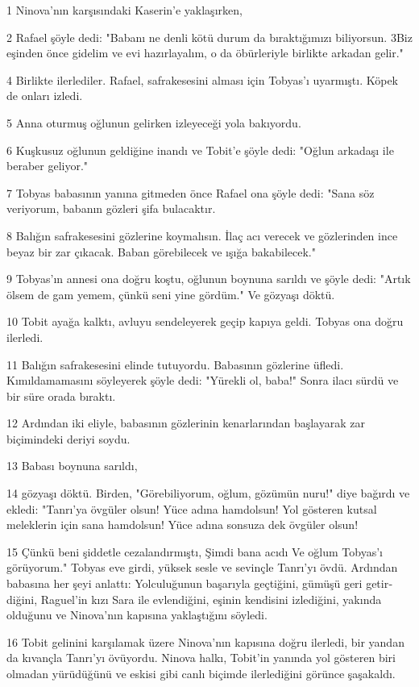 \par 1 Ninova'nın karşısındaki Kaserin'e yaklaşırken,
\par 2 Rafael şöy­le dedi: "Babanı ne denli kötü durum da bıraktığımızı biliyorsun. 3Biz eşin­den önce gidelim ve evi hazırlayalım, o da öbürleriyle birlikte arkadan ge­lir."
\par 4 Birlikte ilerlediler. Rafael, safrakesesini alması için Tobyas'ı uyar­mıştı. Köpek de onları izledi.
\par 5 Anna oturmuş oğlunun gelirken izleyeceği yola bakıyordu.
\par 6 Kuşkusuz oğlunun geldiğine inandı ve Tobit'e şöyle dedi: "Oğlun arkadaşı ile bera­ber geliyor."
\par 7 Tobyas babasının yanına gitme­den önce Rafael ona şöyle dedi: "Sa­na söz veriyorum, babanın gözleri şi­fa bulacaktır.
\par 8 Balığın safrakesesini gözlerine koymalısın. İlaç acı verecek ve gözlerinden ince beyaz bir zar çı­kacak. Baban görebilecek ve ışığa ba­kabilecek."
\par 9 Tobyas'ın annesi ona doğru koş­tu, oğlunun boynuna sarıldı ve şöyle dedi: "Artık ölsem de gam yemem, çünkü seni yine gördüm." Ve gözyaşı döktü.
\par 10 Tobit ayağa kalktı, avluyu sen­deleyerek geçip kapıya geldi. Tobyas ona doğru ilerledi.
\par 11 Balığın safrake­sesini elinde tutuyordu. Babasının göz­lerine üfledi. Kımıldamamasını söyle­yerek şöyle dedi: "Yürekli ol, baba!" Sonra ilacı sürdü ve bir süre orada bı­raktı.
\par 12 Ardından iki eliyle, babasının gözlerinin kenarlarından başlayarak zar biçimindeki deriyi soydu.
\par 13 Baba­sı boynuna sarıldı,
\par 14 gözyaşı döktü. Birden, "Görebiliyorum, oğlum, gö­zümün nuru!" diye bağırdı ve ekledi: "Tanrı'ya övgüler olsun! Yüce adına hamdolsun! Yol gösteren kutsal meleklerin için sana hamdolsun! Yüce adına sonsuza dek övgüler olsun!
\par 15 Çünkü beni şiddetle cezalandırmıştı, Şimdi bana acıdı Ve oğlum Tobyas'ı görüyorum." Tobyas eve girdi, yüksek sesle ve sevinçle Tanrı'yı övdü. Ardından ba­basına her şeyi anlattı: Yolculuğunun başarıyla geçtiğini, gümüşü geri getir­diğini, Raguel'in kızı Sara ile evlen­diğini, eşinin kendisini izlediğini, ya­kında olduğunu ve Ninova'nın kapısı­na yaklaştığını söyledi.
\par 16 Tobit gelinini karşılamak üzere Ninova'nın kapısına doğru ilerledi, bir yandan da kıvançla Tanrı'yı övüyordu. Ninova halkı, Tobit'in yanında yol gösteren biri olmadan yürüdüğü­nü ve eskisi gibi canlı biçimde ilerle­diğini görünce şaşakaldı.
